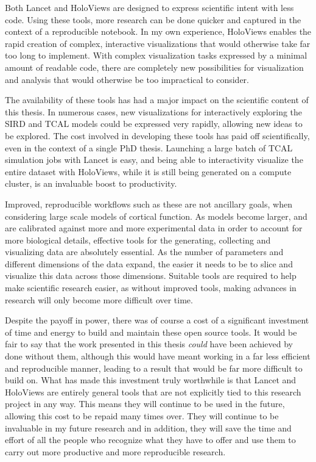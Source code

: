 \documentclass[phd,ianc,twoside]{infthesis}
\begin{document}
Both Lancet and HoloViews are designed to express scientific intent with
less code. Using these tools, more research can be done quicker
and captured in the context of a reproducible notebook. In my own
experience, HoloViews enables the rapid creation of complex, interactive
visualizations that would otherwise take far too long to implement.
With complex visualization tasks expressed by a minimal amount of
readable code, there are completely new possibilities for visualization
and analysis that would otherwise be too impractical to consider.

The availability of these tools has had a major impact on the
scientific content of this thesis. In numerous
cases, new visualizations for interactively exploring the SIRD and TCAL
models could be expressed very rapidly, allowing new ideas to be
explored. The cost involved in developing these tools has paid off scientifically,
even in the context of a single PhD thesis. Launching a large batch of TCAL
simulation jobs with Lancet is easy, and being able to interactivity
visualize the entire dataset with HoloViews, while it is still being
generated on a compute cluster, is an invaluable boost to productivity.

Improved, reproducible workflows such as these are not ancillary goals,
when considering large scale models of cortical function. As models
become larger, and are calibrated against more and more experimental
data in order to account 
for more biological details, effective tools for the generating,
collecting and visualizing data are absolutely essential. As the
number of parameters and different dimensions of the data expand, the
easier it needs to be to slice and visualize this data across those
dimensions. Suitable tools are required to help
make scientific research easier, as without improved
tools, making advances in research will only become more difficult over time.

Despite the payoff in power, there was of course a cost of a
significant investment of time and energy to build and maintain these
open source tools. It would be fair to say that the work presented in
this thesis \emph{could} have been achieved by done without them,
although this would have meant working in a far less efficient and
reproducible manner, leading to a result that would be far more
difficult to build on. What has made this investment truly worthwhile is
that Lancet and HoloViews are entirely general tools that are not 
explicitly tied to this research project in any way. This means they will continue
to be used in the future, allowing this cost to be repaid many times
over. They will continue to be invaluable in my future
research and in addition, they will save the time and effort of all the
people who recognize what they have to offer and use them to carry out
more productive and more reproducible research.
\end{document}
